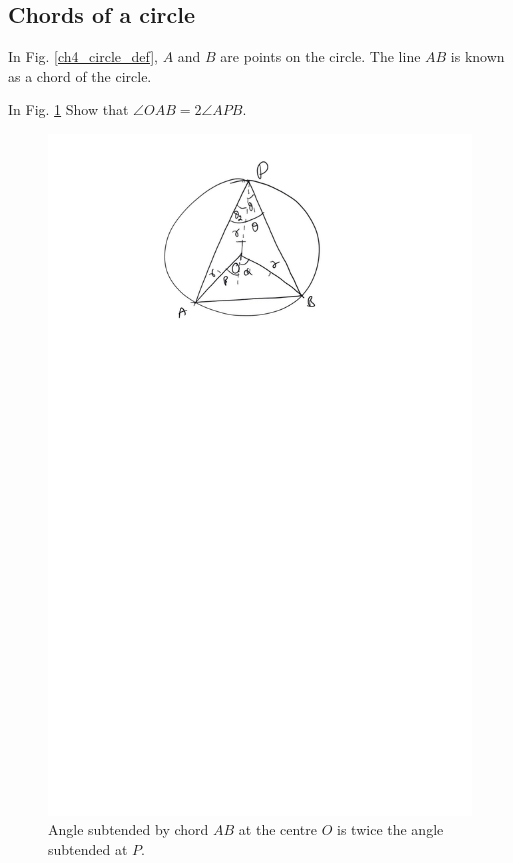 \subsection{Chords of a circle}
\begin{definition}
	In Fig. \ref{ch4_circle_def}, $A$ and $B$ are points on the circle.  The line $AB$ is known as a chord of the circle.
\end{definition}
%
%
\begin{problem}
	\label{ch4_prob_circle_subtend}
	In Fig. \ref{ch4_circle_subtend}  Show that $\angle OAB = 2\angle APB $.
\end{problem}
\begin{figure}[!h]
	\begin{center}
		
		\includegraphics[width=\columnwidth]{./figs/ch4_circle_subtend}
		\vspace*{-10cm}
	\end{center}
	\caption{Angle subtended by chord $AB$ at the centre $O$ is twice the angle subtended at $P$. }
	\label{ch4_circle_subtend}	
\end{figure}

